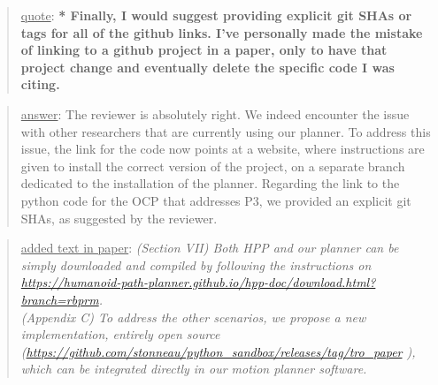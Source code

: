 \documentclass[a4paper]{article}
\newcommand{\done}[0]{}
\newcommand\quot[1]{\begin{quote} \underline{quote}: \textbf{#1}\end{quote}}
\newcommand\as[1]{\begin{quote} \underline{answer}: {#1}\end{quote} }
\newcommand\qt[1]{\begin{quote} \underline{added text in paper}: \textit{#1}\end{quote} \leavevmode \\ }
\begin{document}
\quot{* Finally, I would suggest providing explicit git SHAs or tags for all
of the github links. I've personally made the mistake of linking to a
github project in a paper, only to have that project change and
eventually delete the specific code I was citing. }
\as{The reviewer is absolutely right. We indeed encounter the issue with other researchers that are currently using our planner. 
To address this issue, the link for the code now points at a website, where instructions are given to install the correct version of the project, on a separate branch
dedicated to the installation of the planner.
Regarding the link to the python code for the OCP that addresses P3, we provided an explicit git SHAs, as suggested by the reviewer.}
\qt{(Section VII) Both HPP and our planner can be simply downloaded and compiled by following the instructions on
\url{https://humanoid-path-planner.github.io/hpp-doc/download.html?branch=rbprm}. \\
(Appendix C) To address the other scenarios, we propose a new implementation, entirely open source (\url{https://github.com/stonneau/python_sandbox/releases/tag/tro_paper} ), which can be integrated directly in our motion planner software. }
\done
\end{document}
